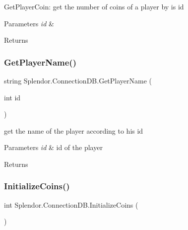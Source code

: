 Get\+Player\+Coin\+: get the number of coins of a player by is id 


\begin{DoxyParams}{Parameters}
{\em id} & \\
\hline
\end{DoxyParams}
\begin{DoxyReturn}{Returns}

\end{DoxyReturn}
\mbox{\label{class_splendor_1_1_connection_d_b_a7d715d5452049ad06f4a407fa5df151c}} 
\subsubsection{\texorpdfstring{Get\+Player\+Name()}{GetPlayerName()}}
{\footnotesize\ttfamily string Splendor.\+Connection\+D\+B.\+Get\+Player\+Name (\begin{DoxyParamCaption}\item[{int}]{id }\end{DoxyParamCaption})}



get the name of the player according to his id 


\begin{DoxyParams}{Parameters}
{\em id} & id of the player\\
\hline
\end{DoxyParams}
\begin{DoxyReturn}{Returns}

\end{DoxyReturn}
\mbox{\label{class_splendor_1_1_connection_d_b_a0174e48615ac3221e92da2e044ca57b6}} 
\subsubsection{\texorpdfstring{Initialize\+Coins()}{InitializeCoins()}}
{\footnotesize\ttfamily int Splendor.\+Connection\+D\+B.\+Initialize\+Coins (\begin{DoxyParamCaption}{ }\end{DoxyParamCaption})}



